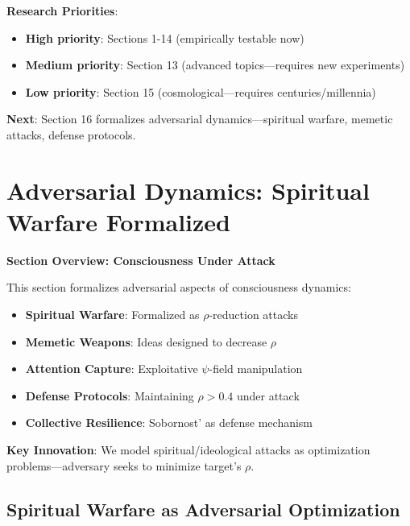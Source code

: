 \documentclass[11pt,a4paper]{article}
\theoremstyle{definition}
\theoremstyle{remark}
\begin{document}
\begin{enumerate}
\begin{mdframed}[backgroundcolor=green!10,linewidth=2pt,linecolor=green!70!black]
\textbf{Research Priorities}:
\begin{itemize}[nosep]
    \item \textbf{High priority}: Sections 1-14 (empirically testable now)
    \item \textbf{Medium priority}: Section 13 (advanced topics—requires new experiments)
    \item \textbf{Low priority}: Section 15 (cosmological—requires centuries/millennia)
\end{itemize}

\textbf{Next}: Section 16 formalizes adversarial dynamics—spiritual warfare, memetic attacks, defense protocols.
\end{mdframed}


\section{Adversarial Dynamics: Spiritual Warfare Formalized}

\begin{mdframed}[backgroundcolor=cyan!5,linewidth=2pt]
\textbf{Section Overview: Consciousness Under Attack}

This section formalizes adversarial aspects of consciousness dynamics:

\begin{itemize}[nosep]
    \item \textbf{Spiritual Warfare}: Formalized as \(\rho\)-reduction attacks
    \item \textbf{Memetic Weapons}: Ideas designed to decrease \(\rho\)
    \item \textbf{Attention Capture}: Exploitative \(\psi\)-field manipulation
    \item \textbf{Defense Protocols}: Maintaining \(\rho > 0.4\) under attack
    \item \textbf{Collective Resilience}: Sobornost' as defense mechanism
\end{itemize}

\textbf{Key Innovation}: We model spiritual/ideological attacks as optimization problems—adversary seeks to minimize target's \(\rho\).
\end{mdframed}

\subsection{Spiritual Warfare as Adversarial Optimization}


\end{enumerate}
\end{document}
